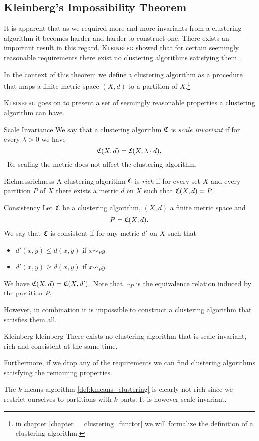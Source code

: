 \subsection{Kleinberg's Impossibility Theorem}
It is apparent that as we required more and more invariants from a clustering algorithm it becomes harder and harder to construct one.
There exists an important result in this regard.
\textsc{Kleinberg} showed that for certain seemingly reasonable requirements there exist no clustering algorithms satisfying them \cite{Kleinberg2002}.

In the context of this theorem we define a clustering algorithm as a procedure that maps a finite metric space $(X,d)$ to a partition of $X$.\footnote{in chapter \ref{chapter__clustering_functor} we will formalize the definition of a clustering algorithm.}

\textsc{Kleinberg} goes on to present a set of seemingly reasonable properties a clustering algorithm can have.

\begin{definition}{Scale Invariance}{}
We say that a clustering algorithm $\mathfrak{C}$ is \emph{scale invariant} if for every $\lambda > 0$ we have
$$
\mathfrak{C}(X,d) = \mathfrak{C}(X, \lambda \cdot d).
$$
\Ie\ Re-scaling the metric does not affect the clustering algorithm.
\end{definition}

\begin{definition}{Richness}{richness}
A clustering algorithm $\mathfrak{C}$ is \emph{rich} if for every set $X$ and every partition $P$ of $X$ there exists a metric $d$ on $X$ such that $\mathfrak{C}(X,d) = P$.
\end{definition}

\begin{definition}{Consistency}{}
Let $\mathfrak{C}$ be a clustering algorithm, $(X,d)$ a finite metric space and
$$
P = \mathfrak{C}(X,d).
$$
We say that $\mathfrak{C}$ is consistent if for any metric $d'$ on $X$ such that
\begin{itemize}
    \item $d'(x,y) \leq d(x,y)$ if $x\sim_P y$
    \item $d'(x,y) \geq d(x,y)$ if $x \not\sim_P y$.
\end{itemize}
We have $\mathfrak{C}(X,d) = \mathfrak{C}(X,d')$. Note that $\sim_P$ is the equivalence relation induced by the partition $P$.
\end{definition}


However, in combination it is impossible to construct a clustering algorithm that satisfies them all.


\begin{theorem}{Kleinberg \cite[Theorem~2.1]{Kleinberg2002}}{kleinberg}
There exists no clustering algorithm that is scale invariant, rich and consistent at the same time.
\end{theorem}

Furthermore, if we drop any of the requirements we can find clustering algorithms satisfying the remaining properties.

The $k$-means algorithm \ref{def:kmeans_clustering} is clearly not rich since we restrict ourselves to partitions with $k$ parts. It is however scale invariant.

